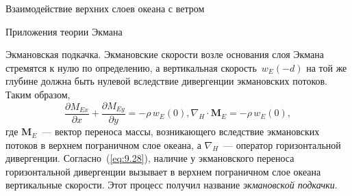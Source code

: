 \begin{chapter}{Взаимодействие верхних слоев океана с ветром}
\begin{section}{Приложения теории Экмана}
\begin{paragraph}{Экмановская подкачка.}
Экмановские скорости возле основания слоя Экмана стремятся к нулю по 
определению, а вертикальная скорость~$w_E(-d)$ на той же глубине должна быть
нулевой вследствие дивергенции экмановских потоков. Таким образом,
\begin{subequations}\label{eq:9.28}
\begin{equation}
 \frac{\partial M_{Ex}}{\partial{x}}+\frac{\partial M_{Ey}}{\partial{y}} 
   = -\rho\,w_E(0),
\end{equation}
\begin{equation}
  \boxed{\nabla_H \cdot \mathbf{M}_E = -\rho\,w_E(0),}
\end{equation}
\end{subequations}
где $\mathbf{M}_E$~--- вектор переноса массы, 
возникающего вследствие экмановских потоков в верхнем пограничном слое океана,
а $\nabla_H$~--- оператор горизонтальной дивергенции. Согласно~(\ref{eq:9.28}),
наличие у экмановского переноса горизонтальной дивергенции вызывает в верхнем
пограничном слое океана вертикальные скорости. Этот процесс получил название
\textit{экмановской подкачки}.
%


\end{paragraph}
\end{section}
\end{chapter}
